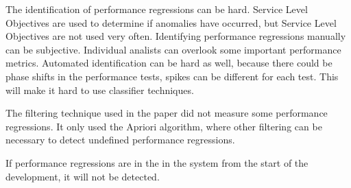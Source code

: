The identification of performance regressions can be hard. \cite{} Service Level Objectives are used to determine if anomalies have occurred, but Service Level Objectives are not used very often. Identifying performance regressions manually can be subjective. Individual analists can overlook some important performance metrics. Automated identification can be hard as well, because there could be phase shifts in the performance tests, spikes can be different for each test. This will make it hard to use classifier techniques. 

The filtering technique used in the paper did not measure some performance regressions. It only used the Apriori algorithm, where other filtering can be necessary to detect undefined performance regressions. 

If performance regressions are in the in the system from the start of the development, it will not be detected. 

